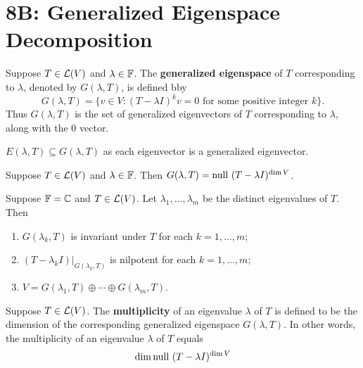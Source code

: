 \documentclass{extarticle}
\begin{document}
\newpage 
\section*{8B: Generalized Eigenspace Decomposition}


\begin{definition}
    Suppose \(T \in \mathcal{L}(V)\) and \(\lambda \in \mathbb{F}\). The \textbf{generalized eigenspace} of 
    \(T\) corresponding to \(\lambda\), denoted by \(G(\lambda, T)\), is defined bby 
    \[G(\lambda, T) = \{v \in V \colon (T - \lambda I)^k v = 0 \text{ for some positive integer }k\}.\]
    Thus \(G(\lambda, T)\) is the set of generalized eigenvectors of \(T\) corresponding to \(\lambda\), 
    along with the 0 vector. 
\end{definition}

\begin{remark}
    \(E(\lambda, T) \subseteq G(\lambda, T)\) as each eigenvector is a generalized eigenvector.
\end{remark}


\begin{corollary}
    Suppose \(T \in \mathcal{L}(V)\) and \(\lambda \in \mathbb{F}\). Then \(G(\lambda, T) = \text{null } (T - \lambda I)^{\dim V}\).
\end{corollary}


\begin{thm}
    Suppose \(\mathbb{F} = \mathbb{C}\) and \(T \in \mathcal{L}(V)\). Let \(\lambda_1, \ldots, \lambda_m\) be the distinct 
    eigenvalues of \(T\). Then 
    \begin{enumerate}[label=(\alph*)]
        \item \(G(\lambda_k, T)\) is invariant under \(T\) for each \(k = 1, \ldots, m\); 
        \item \((T - \lambda_k I)|_{G(\lambda_k, T)}\) is nilpotent for each \(k = 1, \ldots, m\); 
        \item \(V = G(\lambda_1, T) \oplus \cdots \oplus G(\lambda_m, T)\).
    \end{enumerate}
\end{thm}

\begin{definition}[multiplicity]
    Suppose \(T \in \mathcal{L}(V)\). The \textbf{multiplicity} of an eigenvalue \(\lambda\) of 
    \(T\) is defined to be the dimension of the corresponding generalized eigenspace 
    \(G(\lambda, T)\). In other words, the multiplicity of an eigenvalue \(\lambda\) of \(T\)
    equals 
    \[\dim \text{null } (T -\lambda I)^{\dim V}\]
\end{definition}
\end{document}
